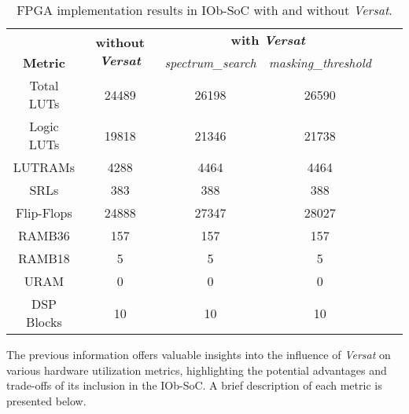 \begin{table}[H]
    \centering
    \begin{tabular}{c|c|c|c|c|c|}
    \cline{2-4}
    \multicolumn{1}{c|}{}  &  \multirow{2}{*}{\parbox{2.5cm}{\centering \textbf{without \textit{Versat}}}} & \multicolumn{2}{c|}{\textbf{with \textit{Versat}}} \\
    \cline{1-1} \cline{3-4}
    \multicolumn{1}{|c|}{\textbf{Metric}} & & \textit{spectrum\_search} & \textit{masking\_threshold} \\
    \hline
    \multicolumn{1}{|c|}{Total LUTs}  & 24489 &  26198 & 26590\\ 
    \hline
    \multicolumn{1}{|c|}{Logic LUTs}  & 19818 &  21346 & 21738\\ 
    \hline
    \multicolumn{1}{|c|}{LUTRAMs}  & 4288 & 4464 & 4464\\ 
    \hline
    \multicolumn{1}{|c|}{SRLs}  & 383 & 388 & 388\\ 
    \hline
    \multicolumn{1}{|c|}{Flip-Flops}  & 24888 & 27347 & 28027 \\ 
    \hline
    \multicolumn{1}{|c|}{RAMB36}  & 157 &  157 & 157 \\ 
    \hline
    \multicolumn{1}{|c|}{RAMB18}  & 5 &  5 & 5\\ 
    \hline
    \multicolumn{1}{|c|}{URAM}  & 0 &  0 & 0\\ 
    \hline
    \multicolumn{1}{|c|}{DSP Blocks}  & 10 & 10 & 10\\ 
    \hline
    \end{tabular}
    \caption{FPGA implementation results in IOb-SoC with and without \textit{Versat}.}
    \label{implementation}
\end{table}


The previous information offers valuable insights into the influence of \textit{Versat} on various hardware utilization metrics, highlighting the potential advantages and trade-offs of its inclusion in the IOb-SoC. A brief description of each metric is presented below.

